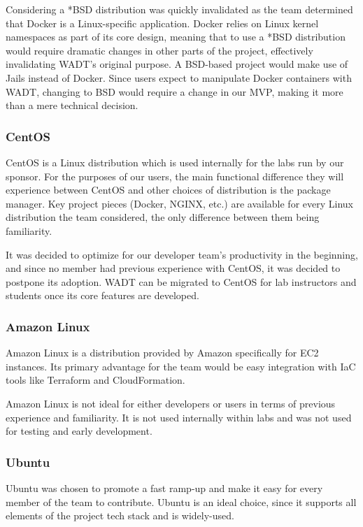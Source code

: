 \documentclass[12pt]{article}
\begin{document}
Considering a *BSD distribution was quickly invalidated as the team determined that Docker is a Linux-specific application. Docker relies on Linux kernel namespaces as part of its core design, meaning that to use a *BSD distribution would require dramatic changes in other parts of the project, effectively invalidating WADT's original purpose. A BSD-based project would make use of Jails instead of Docker. Since users expect to manipulate Docker containers with WADT, changing to BSD would require a change in our MVP, making it more than a mere technical decision.

\subsubsection{CentOS}
CentOS is a Linux distribution which is used internally for the labs run by our sponsor. For the purposes of our users, the main functional difference they will experience between CentOS and other choices of distribution is the package manager. Key project pieces (Docker, NGINX, etc.) are available for every Linux distribution the team considered, the only difference between them being familiarity.

It was decided to optimize for our developer team's productivity in the beginning, and since no member had previous experience with CentOS, it was decided to postpone its adoption. WADT can be migrated to CentOS for lab instructors and students once its core features are developed.

\subsubsection{Amazon Linux}
Amazon Linux is a distribution provided by Amazon specifically for EC2 instances. Its primary advantage for the team would be easy integration with IaC tools like Terraform and CloudFormation.

Amazon Linux is not ideal for either developers or users in terms of previous experience and familiarity. It is not used internally within labs and was not used for testing and early development.

\subsubsection{Ubuntu}
Ubuntu was chosen to promote a fast ramp-up and make it easy for every member of the team to contribute. Ubuntu is an ideal choice, since it supports all elements of the project tech stack and is widely-used.
\end{document}
